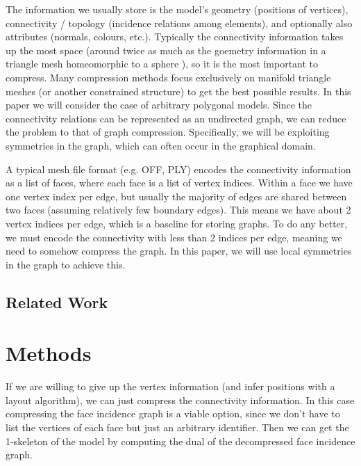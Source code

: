 \documentclass{egpubl}
\begin{document}
The information we usually store is the model's geometry (positions of vertices), connectivity / topology (incidence relations among elements), and optionally also attributes (normals, colours, etc.).
Typically the connectivity information takes up the most space (around twice as much as the goemetry information in a triangle mesh homeomorphic to a sphere \cite{rossignac1999edgebreaker}), so it is the most important to compress.
Many compression methods focus exclusively on manifold triangle meshes (or another constrained structure) to get the best possible results.  
In this paper we will consider the case of arbitrary polygonal models. Since the connectivity relations can be represented as an undirected graph, we can reduce the problem to that of graph compression.
Specifically, we will be exploiting symmetries in the graph, which can often occur in the graphical domain.

A typical mesh file format (e.g. OFF, PLY) encodes the connectivity information as a list of faces, where each face is a list of vertex indices. Within a face we have one vertex index per edge, but usually the majority of edges are shared between two faces (assuming relatively few boundary edges). This means we have about 2 vertex indices per edge, which is a baseline for storing graphs. To do any better, we must encode the connectivity with less than 2 indices per edge, meaning we need to somehow compress the graph. In this paper, we will use local symmetries in the graph to achieve this.

\subsection{Related Work}



\section{Methods}

If we are willing to give up the vertex information (and infer positions with a layout algorithm), we can just compress the connectivity information. In this case compressing the face incidence graph is a viable option, since we don't have to list the vertices of each face but just an arbitrary identifier. Then we can get the 1-skeleton of the model by computing the dual of the decompressed face incidence graph.
\end{document}
